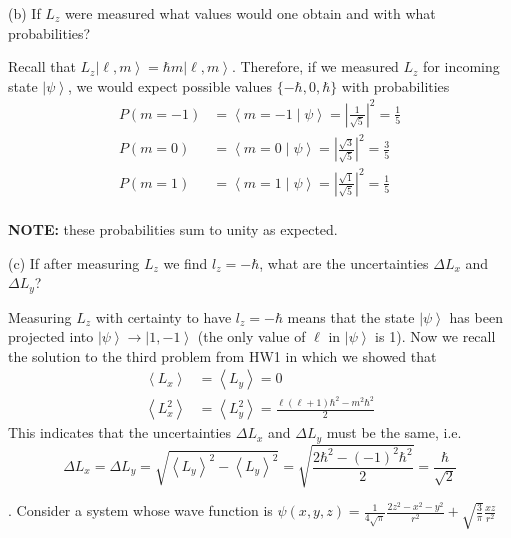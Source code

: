 \documentclass[a4paper, 11pt]{article}
\newcommand{\ket}[1]{\ensuremath{\left|#1\right\rangle}}
\newcommand{\bracket}[2]{\ensuremath{\left\langle #1 \middle| #2 \right\rangle}}
\newcommand{\expectation}[1]{\ensuremath{\left\langle #1 \right\rangle}}
\newenvironment{solution}{%
	\begin{list}{}{%
			\setlength{\topsep}{0pt}%
			\setlength{\leftmargin}{1.5cm}%
			\setlength{\rightmargin}{1.5cm}%
			\setlength{\listparindent}{\parindent}%
			\setlength{\itemindent}{\parindent}%
			\setlength{\parsep}{\parskip}%
		}%
		\item[]}{\end{list}}
\begin{document}
\noindent (b) If $L_z$ were measured what values would one obtain and with what probabilities?\\
\begin{solution}
  \noindent Recall that $L_z\ket{\ell, m} = \hbar m \ket{\ell,m}$. Therefore, if we measured $L_z$ for incoming state $\ket{\psi}$, we would expect possible values $\{-\hbar, 0, \hbar\}$ with probabilities
  \begin{align*}
    P(m=-1) &= \bracket{m=-1}{\psi} = \left| \frac{1}{\sqrt{5}} \right|^2 = \frac{1}{5} \\
    P(m=0) &= \bracket{m=0}{\psi} = \left| \frac{\sqrt{3}}{\sqrt{5}} \right|^2 = \frac{3}{5} \\
    P(m=1) &= \bracket{m=1}{\psi} = \left| \frac{\sqrt{1}}{\sqrt{5}} \right|^2 = \frac{1}{5} \\
  \end{align*}

  \noindent \textbf{NOTE:} these probabilities sum to unity as expected.\\
\end{solution}


\noindent (c) If after measuring $L_z$ we find $l_z = -\hbar$, what are the uncertainties $\Delta L_x$ and $\Delta L_y$? \\
\begin{solution}
  \noindent Measuring $L_z$ with certainty to have $l_z=-\hbar$ means that the state $\ket{\psi}$ has been projected into $\ket{\psi}\rightarrow\ket{1,-1}$ (the only value of $\ell$ in $\ket{\psi}$ is 1). Now we recall the solution to the third problem from HW1 in which we showed that
  \begin{align*}
    \expectation{L_x} & = \expectation{L_y} = 0 \\
    \expectation{L_x^2} &= \expectation{L_y^2} = \frac{\ell(\ell+1)\hbar^2-m^2\hbar^2}{2}
  \end{align*}
  This indicates that the uncertainties $\Delta L_x$ and $\Delta L_y$ must be the same, i.e.
  \begin{equation*}
    \Delta L_x = \Delta L_y = \sqrt{\expectation{L_y}^2-\expectation{L_y}^2} = \sqrt{\frac{2\hbar^2-(-1)^2\hbar^2}{2}} = \frac{\hbar}{\sqrt{2}}
  \end{equation*}
\end{solution}

. Consider a system whose wave function is $\psi(x,y,z)=\frac{1}{4\sqrt{\pi}}\frac{2z^2-x^2-y^2}{r^2}+\sqrt{\frac{3}{\pi}}\frac{xz}{r^2}$\\
\end{document}
